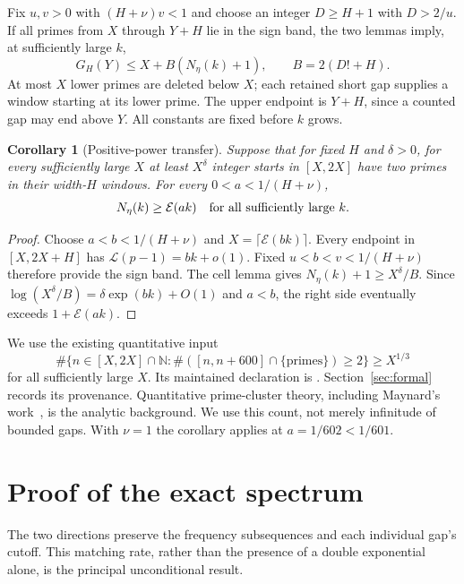 \documentclass[11pt]{article}
\newtheorem{corollary}[theorem]{Corollary}
\theoremstyle{definition}
\newcommand{\LL}{\mathcal L}
\newcommand{\EE}{\mathcal E}
\newcommand{\N}{\mathbb N}
\begin{document}
Fix $u,v>0$ with $(H+\nu)v<1$ and choose an integer
$D\ge H+1$ with $D>2/u$. If all primes from $X$ through $Y+H$
lie in the sign band, the two lemmas imply, at sufficiently large $k$,
\begin{equation}\label{eq:bandcount}
 G_H(Y)\le X+B(N_\eta(k)+1),\qquad B=2(D!+H).
\end{equation}
At most $X$ lower primes are deleted below $X$; each retained
short gap supplies a window starting at its lower prime.
The upper endpoint is $Y+H$, since a counted gap may end above $Y$.
All constants are fixed before $k$ grows.

\begin{corollary}[Positive-power transfer]\label{cor:power}
Suppose that for fixed $H$ and $\delta>0$, for every sufficiently
large $X$ at least $X^\delta$ integer starts in $[X,2X]$ have
two primes in their width-$H$ windows. For every
$0<a<1/(H+\nu)$,
\[
 N_\eta(k)\ge\EE(ak)\quad\hbox{for all sufficiently large }k.
\]
\end{corollary}
\begin{proof}
Choose $a<b<1/(H+\nu)$ and $X=\lceil\EE(bk)\rceil$.
Every endpoint in $[X,2X+H]$ has $\LL(p-1)=bk+o(1)$.
Fixed $u<b<v<1/(H+\nu)$ therefore provide the sign band.
The cell lemma gives $N_\eta(k)+1\ge X^\delta/B$.
Since $\log(X^\delta/B)=\delta\exp(bk)+O(1)$ and $a<b$,
the right side eventually exceeds $1+\EE(ak)$.
\end{proof}

We use the existing quantitative input
\begin{equation}\label{eq:clusterinput}
 \#\{n\in[X,2X]\cap\N:
       \#([n,n+600]\cap\{\text{primes}\})\ge2\}\ge X^{1/3}
\end{equation}
for all sufficiently large $X$. Its maintained declaration is
.
Section~\ref{sec:formal} records its provenance. Quantitative
prime-cluster theory, including Maynard's work~\cite{Maynard},
is the analytic background. We use this count, not merely
infinitude of bounded gaps. With $\nu=1$ the corollary applies
at $a=1/602<1/601$.

\section{Proof of the exact spectrum}\label{sec:sharp}
The two directions preserve the frequency subsequences and each
individual gap's cutoff. This matching rate, rather than the presence
of a double exponential alone, is the principal unconditional result.
\end{document}
